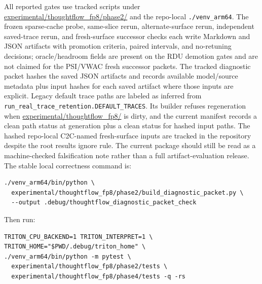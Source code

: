 \documentclass{article}
\begin{document}
All reported gates use tracked scripts under
\url{experimental/thoughtflow_fp8/phase2/} and the repo-local
\texttt{./venv\_arm64}. The frozen sparse-cache probe, same-slice rerun,
alternate-surface rerun, independent saved-trace rerun, and fresh-surface
successor checks each write Markdown and JSON artifacts with promotion
criteria, paired intervals, and no-retuning decisions; oracle/headroom fields
are present on the RDU demotion gates and are not claimed for the PSI/VWAC fresh
successor packets. The tracked diagnostic packet hashes the saved JSON artifacts and
records available model/source metadata plus input hashes for each saved
artifact where those inputs are explicit. Legacy default trace paths are labeled
as inferred from \texttt{run\_real\_trace\_retention.DEFAULT\_TRACES}. Its
builder refuses regeneration when
\url{experimental/thoughtflow_fp8/} is dirty, and the current manifest records
a clean path status at generation plus a clean status for hashed input paths.
The hashed repo-local C2C-named fresh-surface inputs are
tracked in the repository despite the root results ignore rule. The current
package should still be read as a
machine-checked falsification note rather than a full artifact-evaluation
release. The stable local correctness command is:
\begin{verbatim}
./venv_arm64/bin/python \
  experimental/thoughtflow_fp8/phase2/build_diagnostic_packet.py \
  --output .debug/thoughtflow_diagnostic_packet_check
\end{verbatim}
Then run:
\begin{verbatim}
TRITON_CPU_BACKEND=1 TRITON_INTERPRET=1 \
TRITON_HOME="$PWD/.debug/triton_home" \
./venv_arm64/bin/python -m pytest \
  experimental/thoughtflow_fp8/phase2/tests \
  experimental/thoughtflow_fp8/phase4/tests -q -rs
\end{verbatim}
\end{document}
